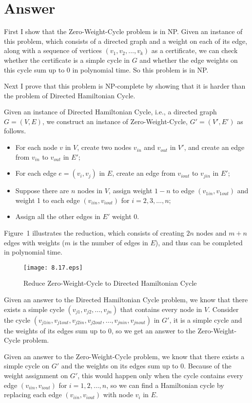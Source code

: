 \documentclass[12pt,letterpaper]{article}
\begin{document}
\section*{Answer}
First I show that the Zero-Weight-Cycle problem is in NP. Given an instance of this problem, which consists of a directed graph and a weight on each of its edge, along with a sequence of vertices $(v_1, v_2, \dots, v_k)$ as a certificate, we can check whether the certificate is a simple cycle in $G$ and whether the edge weights on this cycle sum up to 0 in polynomial time. So this problem is in NP.

Next I prove that this problem is NP-complete by showing that it is harder than the problem of Directed Hamiltonian Cycle.

Given an instance of Directed Hamiltonian Cycle, i.e., a directed graph $G=(V,E)$, we construct an instance of Zero-Weight-Cycle, $G'=(V',E')$ as follows.
\begin{itemize}
\item For each node $v$ in $V$, create two nodes $v_{in}$ and $v_{out}$ in $V'$, and create an edge from $v_{in}$ to $v_{out}$ in $E'$;
\item For each edge $e=(v_i,v_j)$ in $E$, create an edge from $v_{iout}$ to $v_{jin}$ in $E'$;
\item Suppose there are $n$ nodes in $V$, assign weight $1-n$ to edge $(v_{1in}, v_{1out})$ and weight 1 to each edge $(v_{iin}, v_{iout})$ for $i=2, 3, \dots, n$;
\item Assign all the other edges in $E'$ weight 0.
\end{itemize}
Figure~1 illustrates the reduction, which consists of creating $2n$ nodes and $m+n$ edges with weights ($m$ is the number of edges in $E$), and thus can be completed in polynomial time.
\begin{figure}
\begin{center}
\texttt{[image: 8.17.eps]}
\caption{Reduce Zero-Weight-Cycle to Directed Hamiltonian Cycle}
\end{center}
\end{figure}

Given an answer to the Directed Hamiltonian Cycle problem, we know that there exists a simple cycle $(v_{j1}, v_{j2}, \dots, v_{jn})$ that contains every node in $V$. Consider the cycle $(v_{j1in}, v_{j1out}, v_{j2in}, v_{j2out}, \dots, v_{jnin}, v_{jnout})$ in $G'$, it is a simple cycle and the weights of its edges sum up to 0, so we get an answer to the Zero-Weight-Cycle problem.

Given an answer to the Zero-Weight-Cycle problem, we know that there exists a simple cycle on $G'$ and the weights on its edges sum up to 0. Because of the weight assignment on $G'$, this would happen only when the cycle contains every edge $(v_{iin}, v_{iout})$ for $i=1,2,\dots,n$, so we can find a Hamiltonian cycle by replacing each edge $(v_{iin}, v_{iout})$ with node $v_i$ in $E$.
\end{document}
